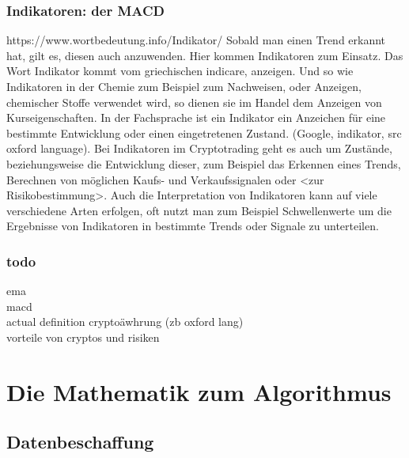 \documentclass[12pt]{article}
\begin{document}
	\subsubsection{Indikatoren: der MACD}
		https://www.wortbedeutung.info/Indikator/ Sobald man einen Trend erkannt hat, gilt es, diesen auch anzuwenden. Hier kommen Indikatoren zum Einsatz. Das Wort Indikator kommt vom griechischen indicare, \glqq anzeigen\grqq{}. Und so wie Indikatoren in der Chemie zum Beispiel zum Nachweisen, oder Anzeigen, chemischer Stoffe verwendet wird, so dienen sie im Handel dem Anzeigen von Kurseigenschaften. In der Fachsprache ist ein Indikator ein Anzeichen für eine bestimmte Entwicklung oder einen eingetretenen Zustand. (Google, indikator, src oxford language). Bei Indikatoren im Cryptotrading geht es auch um Zustände, beziehungsweise die Entwicklung dieser, zum Beispiel das Erkennen eines Trends, Berechnen von möglichen Kaufs- und Verkaufssignalen oder <zur Risikobestimmung>. Auch die Interpretation von Indikatoren kann auf viele verschiedene Arten erfolgen, oft nutzt man zum Beispiel Schwellenwerte um die Ergebnisse von Indikatoren in bestimmte Trends oder Signale zu unterteilen.
	\subsubsection{todo}
		ema \\
		macd\\
		actual definition cryptoäwhrung (zb oxford lang)\\
		vorteile von cryptos und risiken

\section{Die Mathematik zum Algorithmus}
\subsection{Datenbeschaffung}
\end{document}
